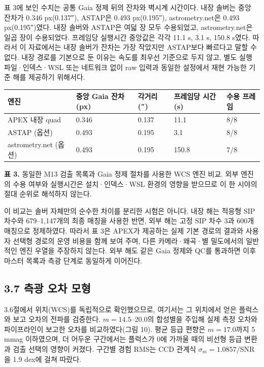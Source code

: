 표 3에 보인 수치는 공통 Gaia 정제 뒤의 잔차와 벽시계 시간이다. 내장 솔버는 중앙 잔차가 0.346 px(0.137″), ASTAP은 0.493 px(0.195″), astrometry.net은 0.493 px(0.195″)였다. 내장 솔버와 ASTAP은 여덟 장 모두 수용되었고, astrometry.net은 일곱 장이 수용되었다. 프레임당 실행시간 중앙값은 각각 11.1 s, 3.1 s, 150.8 s였다. 따라서 이 자료에서는 내장 솔버가 잔차는 가장 작았지만 ASTAP보다 빠르다고 말할 수 없다. 내장 경로를 기본으로 둔 이유는 속도를 최우선 기준으로 두지 않고, 별도 실행 파일·인덱스·WSL 또는 네트워크 없이 raw 입력과 동일한 설정에서 재현 가능한 기준 해를 제공하기 위해서다.



\begin{table}[!t]
\centering\small
\begin{tabularx}{\textwidth}{XXXXX}
\toprule
엔진 & 중앙 Gaia 잔차 (px) & 각거리 (″) & 프레임당 시간 (s) & 수용 프레임 \\
\midrule
APEX 내장 quad & 0.346 & 0.137 & 11.1 & 8/8 \\
ASTAP (옵션) & 0.493 & 0.195 & 3.1 & 8/8 \\
astrometry.net (옵션) & 0.493 & 0.195 & 150.8 & 7/8 \\
\bottomrule
\end{tabularx}
\end{table}

\textbf{표 3.} 동일한 M13 검출 목록과 Gaia 정제 절차를 사용한 WCS 엔진 비교. 외부 엔진의 수용 여부와 실행시간은 설치·인덱스·WSL 환경의 영향을 받으므로 이 한 시야의 절대 순위로 해석하지 않는다.



이 비교는 솔버 자체만의 순수한 차이를 분리한 시험은 아니다. 내장 해는 적응형 SIP 차수와 679–1,147개의 최종 매칭을 사용한 반면, 외부 해는 고정 SIP 차수 3과 600개 매칭으로 정제하였다. 따라서 표 3은 APEX가 제공하는 실제 기본 경로의 결과와 사용자 선택형 경로의 운영 비용을 함께 보여 주며, 다른 카메라·왜곡·별 밀도에서의 일반적인 엔진 우열을 주장하지 않는다. 외부 해도 같은 Gaia 정제와 QC를 통과하면 이후 마스터 목록과 측광 단계로 동일하게 이어진다.



\subsection{3.7 측광 오차 모형}

3.6절에서 위치(WCS)를 독립적으로 확인했으므로, 여기서는 그 위치에서 얻은 플럭스와 보고 오차의 전파를 검증한다. $m=14.5$–20.0의 합성별을 주입해 실제 측정 오차와 파이프라인이 보고한 오차를 비교하였다(그림 10). 평균 등급 편향은 $m=17.0$까지 5 mmag 이하였으며, 더 어두운 구간에서는 플럭스가 0에 가까울 때의 비선형 등급 변환과 검출 선택의 영향이 커졌다. 구간별 경험 RMS는 CCD 관계식 $\sigma_m=1.0857/\mathrm{SNR}$을 1.9 dex에 걸쳐 따랐다.



